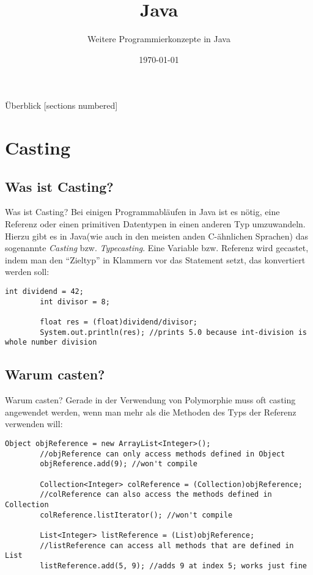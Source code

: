 

\usepackage{csquotes}

\title{Java}
\subtitle{Weitere Programmierkonzepte in Java}
\date{\today}



\begin{frame}
    \titlepage
\end{frame}

\begin{frame}{Überblick}
    [sections numbered]
    \tableofcontents
\end{frame}

\section{Casting}
\subsection{Was ist Casting?}

\begin{frame}[fragile]{Was ist Casting?}
    Bei einigen Programmabläufen in Java ist es nötig, eine Referenz oder einen primitiven Datentypen in einen anderen Typ umzuwandeln.
    Hierzu gibt es in Java(wie auch in den meisten anden C-ähnlichen Sprachen) das sogenannte \textit{Casting} bzw. \textit{Typecasting}.
    Eine Variable bzw. Referenz wird gecastet, indem man den \enquote{Zieltyp} in Klammern vor das Statement setzt, das konvertiert werden soll:
    \begin{lstlisting}[gobble=8]
        int dividend = 42;
        int divisor = 8;

        float res = (float)dividend/divisor;
        System.out.println(res); //prints 5.0 because int-division is whole number division
    \end{lstlisting}
\end{frame}

\subsection{Warum casten?}
\begin{frame}[fragile]{Warum casten?}
    Gerade in der Verwendung von Polymorphie muss oft casting angewendet werden, wenn man mehr als die Methoden des Typs der Referenz verwenden will:
    \begin{lstlisting}[gobble=8,basicstyle=\ttfamily\scriptsize]
        Object objReference = new ArrayList<Integer>();
        //objReference can only access methods defined in Object
        objReference.add(9); //won't compile

        Collection<Integer> colReference = (Collection)objReference;
        //colReference can also access the methods defined in Collection
        colReference.listIterator(); //won't compile

        List<Integer> listReference = (List)objReference;
        //listReference can access all methods that are defined in List
        listReference.add(5, 9); //adds 9 at index 5; works just fine
    \end{lstlisting}
\end{frame}

